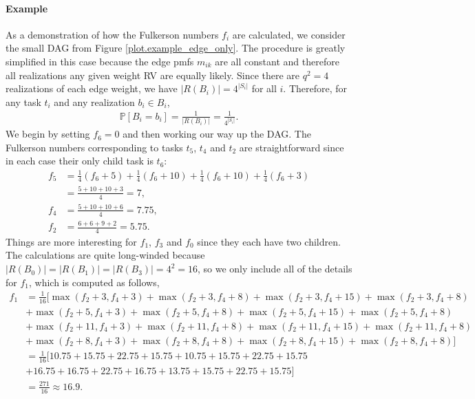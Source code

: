 \documentclass[12pt]{article}
\def\P{\mathbb{P}}
\begin{document}
\paragraph{Example}
\label{para.fulkerson_example}

As a demonstration of how the Fulkerson numbers $f_i$ are calculated, we consider the small DAG from Figure \ref{plot.example_edge_only}. The procedure is greatly simplified in this case because the edge pmfs $m_{ik}$ are all constant and therefore all realizations any given weight RV are equally likely. Since there are $q^2 = 4$ realizations of each edge weight, we have $|R(B_i)| = 4^{|S_i|}$ for all $i$. Therefore, for any task $t_i$ and any realization $b_i \in B_i$,  
\begin{align*}
\P[B_i = b_i] = \frac{1}{|R(B_i)|} = \frac{1}{4^{|S_i|}}. 
\end{align*}   
We begin by setting $f_6 = 0$ and then working our way up the DAG. The Fulkerson numbers corresponding to tasks $t_5$, $t_4$ and $t_2$ are straightforward since in each case their only child task is $t_6$:
\begin{align*}
f_5 &= \frac{1}{4}(f_6 + 5) + \frac{1}{4}(f_6 + 10) + \frac{1}{4}(f_6 + 10) + \frac{1}{4}(f_6 + 3) \\
&= \frac{5 + 10 + 10 + 3}{4} = 7, \\
f_4 &= \frac{5 + 10 + 10 + 6}{4} = 7.75, \\
f_2 &= \frac{6 + 6 + 9 + 2}{4} = 5.75.
\end{align*}    
Things are more interesting for $f_1$, $f_3$ and $f_0$ since they each have two children. The calculations are quite long-winded because $|R(B_0)| = |R(B_1)| = |R(B_3)| = 4^2 = 16$, so we only include all of the details for $f_1$, which is computed as follows, 
{\footnotesize
\begin{align*} 
f_1 &= \frac{1}{16} [ \max(f_2 + 3, f_4 + 3) + \max(f_2 + 3, f_4 + 8) + \max(f_2 + 3, f_4 + 15) + \max(f_2 + 3, f_4 + 8)  \\
&+ \max(f_2 + 5, f_4 + 3) + \max(f_2 + 5, f_4 + 8) + \max(f_2 + 5, f_4 + 15) + \max(f_2 + 5, f_4 + 8) \\
&+ \max(f_2 + 11, f_4 + 3) + \max(f_2 + 11, f_4 + 8) + \max(f_2 + 11, f_4 + 15) + \max(f_2 + 11, f_4 + 8) \\
&+ \max(f_2 + 8, f_4 + 3) + \max(f_2 + 8, f_4 + 8) + \max(f_2 + 8, f_4 + 15) + \max(f_2 + 8, f_4 + 8) ] \\
&= \frac{1}{16} [10.75 + 15.75 + 22.75 + 15.75 + 10.75 + 15.75 + 22.75 + 15.75 \\
&+ 16.75 + 16.75 + 22.75 + 16.75 + 13.75 + 15.75 + 22.75 + 15.75 ] \\
&= \frac{271}{16} \approx 16.9.
\end{align*} 
}%
\end{document}
